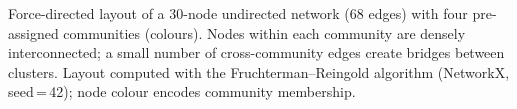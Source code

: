 \caption{Force-directed layout of a 30-node undirected network (68 edges) with four pre-assigned communities (colours). Nodes within each community are densely interconnected; a small number of cross-community edges create bridges between clusters. Layout computed with the Fruchterman--Reingold algorithm (NetworkX, seed\,=\,42); node colour encodes community membership.}
